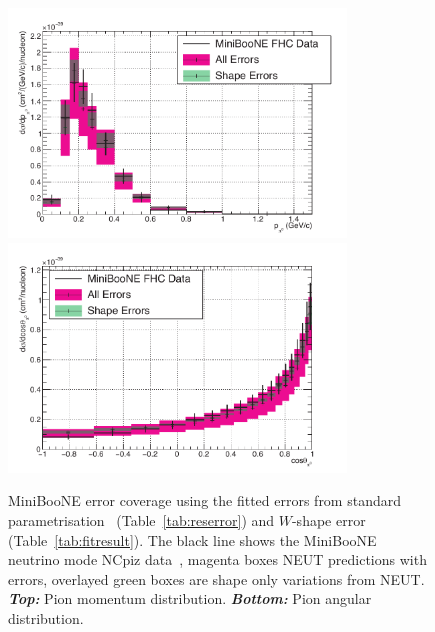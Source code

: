 \begin{figure}[ht]
  \center
  \includegraphics[width=0.8\textwidth]{T2K-TN-254/images/systematics/MB_NC1pi0_1Dppi0_fhc_nu_1WShape_good.pdf}\\ %
  \includegraphics[width=0.8\textwidth]{T2K-TN-254/images/systematics/MB_NC1pi0_1Dcospi0_fhc_nu_1WShape_good.pdf} %
  \caption[MiniBooNE error coverage using the fitted
  errors]{\Gls{MiniBooNE} error coverage using the fitted errors from
    standard parametrisation~\cite{TN315} (Table~\ref{tab:reserror})
    and $W$-shape error (Table~\ref{tab:fitresult}). The black line
    shows the \Gls{MiniBooNE} neutrino mode \Gls{NC}\gls{piz}
    data~\cite{AguilarArevalo:2009ww}, magenta boxes \Gls{NEUT}
    predictions with errors, overlayed green boxes are shape only
    variations from \Gls{NEUT}. \textbf{\textit{Top:}} Pion momentum
    distribution. \textbf{\textit{Bottom:}} Pion angular
    distribution.}
  \label{fig:miniboonepostfit}
\end{figure}


